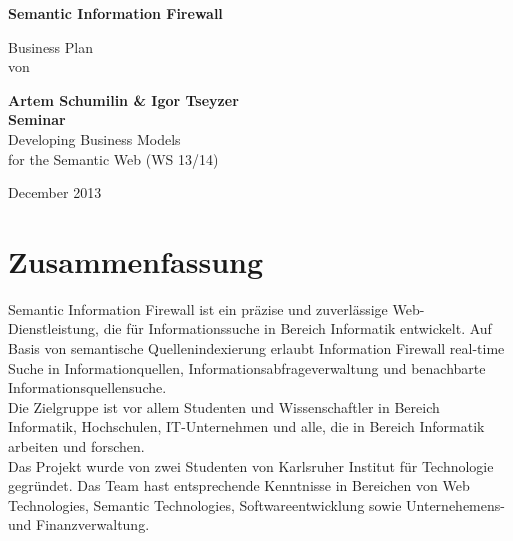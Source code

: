 \documentclass[12pt, a4paper]{article} %
\begin{document}
\thispagestyle{empty}

\begin{titlepage}
\begin{center}
\hbox{}
\vfill

{\color{blue}\huge\bfseries Semantic Information Firewall\par}
\vskip 1.8cm
Business Plan\\
von\\[2mm]
\vskip 1cm

{\large\bfseries Artem Schumilin \& Igor Tseyzer\\}
\vskip 4cm
{\bfseries Seminar}\\
Developing Business Models \\
for the Semantic Web (WS 13/14) \\
\vskip 3cm

\vskip 3cm
December 2013

\end{center}
\vfill
\end{titlepage}


\tableofcontents

\newpage


\section{Zusammenfassung}

Semantic Information Firewall ist ein präzise und zuverlässige Web-Dienstleistung, die für Informationssuche in Bereich Informatik entwickelt. Auf Basis von semantische Quellenindexierung erlaubt Information Firewall real-time Suche in Informationquellen, Informationsabfrageverwaltung und benachbarte Informationsquellensuche.\\
Die Zielgruppe ist vor allem Studenten und Wissenschaftler in Bereich Informatik, Hochschulen, IT-Unternehmen und alle, die in Bereich Informatik arbeiten und forschen.\\
Das Projekt wurde von zwei Studenten von Karlsruher Institut für Technologie gegründet. Das Team hast entsprechende Kenntnisse in Bereichen von Web Technologies, Semantic Technologies, Softwareentwicklung sowie Unternehemens- und Finanzverwaltung. \\
\end{document}
